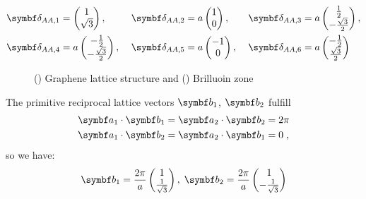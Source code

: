 \documentclass[../notes.tex]{subfiles}
\begin{document}
\begin{alignat}{3}
	&\vb{\delta}_{AA, 1} = \begin{pmatrix} 1 \\ \sqrt{3} \end{pmatrix}, \;
	&&\vb{\delta}_{AA, 2} = a \begin{pmatrix} 1 \\ 0 \end{pmatrix}, \;
	& &\vb{\delta}_{AA, 3} = a \begin{pmatrix} \frac{1}{2} \\ -\frac{\sqrt{3}}{2} \end{pmatrix}, \\
	&\vb{\delta}_{AA, 4} = a \begin{pmatrix} -\frac{1}{2} \\ -\frac{\sqrt{3}}{2} \end{pmatrix}, \;
	&&\vb{\delta}_{AA, 5} = a \begin{pmatrix} -1 \\ 0 \end{pmatrix}, \;
	& &\vb{\delta}_{AA, 6} = a \begin{pmatrix} -\frac{1}{2} \\ \frac{\sqrt{3}}{2} \end{pmatrix}
\end{alignat}
\begin{figure}[tb]
	\centering
	\begin{subfigure}[t]{0.5\textwidth}
		\centering
		\caption{\hfill\null}\label{sfig:graphene lattice structure}
		
	\end{subfigure}%
	\begin{subfigure}[t]{0.5\textwidth}
		\centering
		\caption{\hfill\null}\label{sfig:graphene Brillouin zone}
		
	\end{subfigure}
	\caption{() Graphene lattice structure and () Brilluoin zone} 
	\label{fig:Graphene lattice structure and Brilluoin zone}
\end{figure}
The primitive reciprocal lattice vectors \(\vb{b}_1\), \(\vb{b}_2\) fulfill 
\begin{align}
	\vb{a}_1 \cdot \vb{b}_1 &= \vb{a}_2 \cdot \vb{b}_2 = 2\pi \\
	\vb{a}_1 \cdot \vb{b}_2 &= \vb{a}_2 \cdot \vb{b}_1 = 0\;,
\end{align}
so we have:
\begin{align}
	\vb{b}_1 = \frac{2\pi}{a} \begin{pmatrix} 1 \\ \frac{1}{\sqrt{3}} \end{pmatrix},\;
	\vb{b}_2 = \frac{2\pi}{a} \begin{pmatrix} 1 \\ - \frac{1}{\sqrt{3}} \end{pmatrix}
\end{align}
\end{document}
